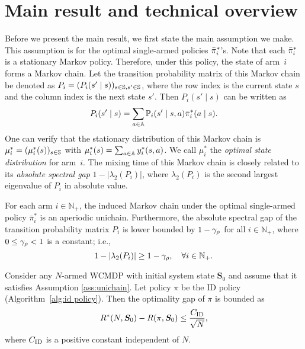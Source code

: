 \documentclass[11pt,letterpaper]{article}
\begin{document}
\section{Main result and technical overview}\label{sec:result-tech-overview}
Before we present the main result, we first state the main assumption we make.
This assumption is for the optimal single-armed policies ${\bar{\pi}}^*_i$'s.
Note that each ${\bar{\pi}}^*_i$ is a stationary Markov policy.
Therefore, under this policy, the state of arm~$i$ forms a Markov chain.
Let the transition probability matrix of this Markov chain be denoted as $P_i=(P_i(s'\mid s))_{s\in\mathbb{S},s'\in\mathbb{S}}$, where the row index is the current state $s$ and the column index is the next state $s'$.
Then $P_i(s'\mid s)$ can be written as
\begin{equation}
    P_i(s'\mid s) = \sum_{a\in \mathbb{A}} \mathbb{P}_i(s'\mid s,a)\bar{\pi}_i^*(a\mid s).
\end{equation}
One can verify that the stationary distribution of this Markov chain is $\mu_i^*=(\mu_i^*(s))_{s\in\mathbb{S}}$ with $\mu_i^*(s)=\sum_{a\in\mathbb{A}}y^*_i(s,a)$.
We call $\mu_i^*$ the \emph{optimal state distribution} for arm~$i$.
The mixing time of this Markov chain is closely related to its \emph{absolute spectral gap} $1-|\lambda_2(P_i)|$, where $\lambda_2(P_i)$ is the second largest eigenvalue of $P_i$ in absolute value.

\begin{assumption}\label{ass:unichain}
    For each arm $i\in\mathbb{N}_+$, the induced Markov chain under the optimal single-armed policy $\bar{\pi}_i^*$ is an aperiodic unichain. 
    Furthermore, the absolute spectral gap of the transition probability matrix $P_i$ is lower bounded by $1-\gamma_{\rho}$ for all $i\in\mathbb{N}_+$, where $0\le \gamma_{\rho}<1$ is a constant; i.e.,
    \begin{equation}
        1-|\lambda_2(P_i)| \ge 1-\gamma_{\rho}, \quad\forall i\in\mathbb{N}_+.
    \end{equation}
\end{assumption}
\begin{theorem}
\label{thm:opt-gap-bound}
    Consider any $N$-armed WCMDP with initial system state $\bm{S}_0$ and assume that it satisfies Assumption \ref{ass:unichain}. Let policy $\pi$ be the ID policy (Algorithm~\ref{alg:id policy}). Then the optimality gap of $\pi$ is bounded as
    \begin{align*}
        R^*(N,\bm{S}_0)-R(\pi,\bm{S}_0) \leq\frac{C_{\textnormal{ID}}}{\sqrt{N}},
    \end{align*}
    where $C_{\textnormal{ID}}$ is a positive constant independent of $N$. 
\end{theorem}
\end{document}
